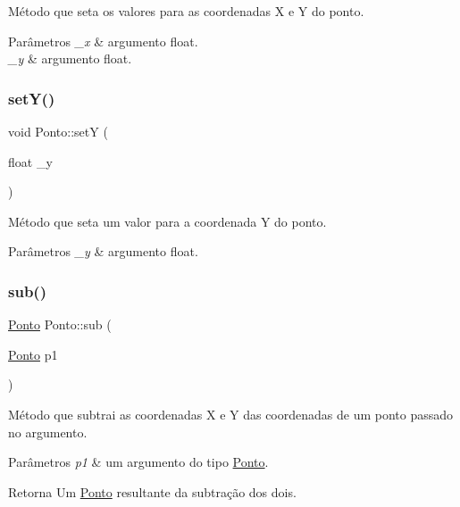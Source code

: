 Método que seta os valores para as coordenadas X e Y do ponto. 


\begin{DoxyParams}{Parâmetros}
{\em \+\_\+x} & argumento float. \\
\hline
{\em \+\_\+y} & argumento float. \\
\hline
\end{DoxyParams}
\mbox{\label{classPonto_a2d9e5b9fade9d3f3f21122a2dc2f5e11}} 
\subsubsection{\texorpdfstring{set\+Y()}{setY()}}
{\footnotesize\ttfamily void Ponto\+::setY (\begin{DoxyParamCaption}\item[{float}]{\+\_\+y }\end{DoxyParamCaption})\hspace{0.3cm}{\ttfamily [inline]}}



Método que seta um valor para a coordenada Y do ponto. 


\begin{DoxyParams}{Parâmetros}
{\em \+\_\+y} & argumento float. \\
\hline
\end{DoxyParams}
\mbox{\label{classPonto_a8404fcad0fca2ce768ab9e1550f5d3a0}} 
\subsubsection{\texorpdfstring{sub()}{sub()}}
{\footnotesize\ttfamily \mbox{\hyperlink{classPonto}{Ponto}} Ponto\+::sub (\begin{DoxyParamCaption}\item[{\mbox{\hyperlink{classPonto}{Ponto}}}]{p1 }\end{DoxyParamCaption})\hspace{0.3cm}{\ttfamily [inline]}}



Método que subtrai as coordenadas X e Y das coordenadas de um ponto passado no argumento. 


\begin{DoxyParams}{Parâmetros}
{\em p1} & um argumento do tipo \mbox{\hyperlink{classPonto}{Ponto}}. \\
\hline
\end{DoxyParams}
\begin{DoxyReturn}{Retorna}
Um \mbox{\hyperlink{classPonto}{Ponto}} resultante da subtração dos dois. 
\end{DoxyReturn}
\mbox{\label{classPonto_a96a4395204ec010814e67d20705e630f}} 
